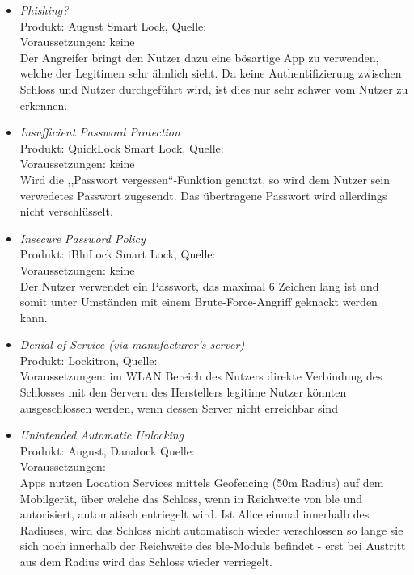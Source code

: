 \begin{itemize}[leftmargin=0cm,label={}]
	    \item \emph{Phishing?}\\
	        Produkt: August Smart Lock, Quelle: \cite{Ye2017}\\ 
            Voraussetzungen: keine\\
            Der Angreifer bringt den Nutzer dazu eine bösartige App zu verwenden, welche der Legitimen sehr ähnlich sieht. 
            Da keine Authentifizierung zwischen Schloss und Nutzer durchgeführt wird, ist dies nur sehr schwer vom Nutzer zu erkennen.
        \item \emph{Insufficient Password Protection}\\
	        Produkt: QuickLock Smart Lock, Quelle: \cite{Ye2017}\\ 
            Voraussetzungen: keine\\
            Wird die ,,Passwort vergessen``-Funktion genutzt, so wird dem Nutzer sein verwedetes Passwort zugesendt. 
            Das übertragene Passwort wird allerdings nicht verschlüsselt.
        \item \emph{Insecure Password Policy}\\
            Produkt: iBluLock Smart Lock, Quelle: \cite{Ye2017}\\
            Voraussetzungen: keine\\
            Der Nutzer verwendet ein Passwort, das maximal 6 Zeichen lang ist und somit unter Umständen mit einem Brute-Force-Angriff geknackt werden kann.
        \item \emph{Denial of Service (via manufacturer's server)}\\
            Produkt: Lockitron, Quelle: \cite{Ye2017}\\
            Voraussetzungen: im WLAN Bereich des Nutzers
            direkte Verbindung des Schlosses mit den Servern des Herstellers \textrightarrow legitime Nutzer könnten ausgeschlossen werden, wenn dessen Server nicht erreichbar sind
        \item \emph{Unintended Automatic Unlocking}\\
            Produkt: August, Danalock Quelle: \cite{Ho2016}\\
            Voraussetzungen: \\
            Apps nutzen Location Services mittels Geofencing (50m Radius) auf dem Mobilgerät, über welche das Schloss, wenn in Reichweite von \gls{ble} und autorisiert, automatisch entriegelt wird.
            Ist Alice einmal innerhalb des Radiuses, wird das Schloss nicht automatisch wieder verschlossen so lange sie sich noch innerhalb der Reichweite des \gls{ble}-Moduls befindet - erst bei Austritt aus dem Radius wird das Schloss wieder verriegelt.

\end{itemize}
